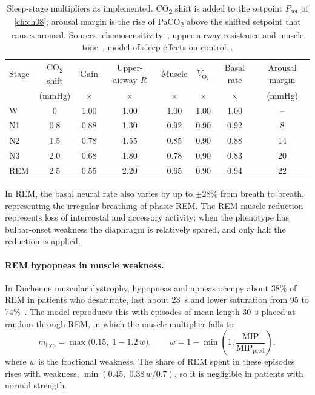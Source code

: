 \begin{table}[ht]
\centering
\caption{Sleep-stage multipliers as implemented. CO\textsubscript{2} shift is added to the setpoint $P_{\mathrm{set}}$ of \cref{ch:ch08}; arousal margin is the rise of PaCO\textsubscript{2} above the shifted setpoint that causes arousal. Sources: chemosensitivity~\citep{douglas1982,berthonjones1984}, upper-airway resistance and muscle tone~\citep{horner1996,white2005}, model of sleep effects on control~\citep{khoo1982}.}
\label{tab:sl-phys}
\small
\begin{tabular}{@{}lccccccc@{}}
\toprule
Stage & CO\textsubscript{2} shift & Gain & Upper-airway $R$ & Muscle & $\dot V_{\mathrm{O_2}}$ & Basal rate & Arousal margin \\
 & (mmHg) & $\times$ & $\times$ & $\times$ & $\times$ & $\times$ & (mmHg) \\
\midrule
W   & 0   & 1.00 & 1.00 & 1.00 & 1.00 & 1.00 & -- \\
N1  & 0.8 & 0.88 & 1.30 & 0.92 & 0.90 & 0.92 & 8 \\
N2  & 1.5 & 0.78 & 1.55 & 0.85 & 0.90 & 0.88 & 14 \\
N3  & 2.0 & 0.68 & 1.80 & 0.78 & 0.90 & 0.83 & 20 \\
REM & 2.5 & 0.55 & 2.20 & 0.65 & 0.90 & 0.94 & 22 \\
\bottomrule
\end{tabular}
\end{table}

In REM, the basal neural rate also varies by up to $\pm 28\%$ from breath to breath, representing the irregular breathing of phasic REM. The REM muscle reduction represents loss of intercostal and accessory activity; when the phenotype has bulbar-onset weakness the diaphragm is relatively spared, and only half the reduction is applied.

\paragraph{REM hypopneas in muscle weakness.} In Duchenne muscular dystrophy, hypopneas and apneas occupy about 38\% of REM in patients who desaturate, last about \SI{23}{\second} and lower saturation from 95 to 74\%~\citep{smith1988}. The model reproduces this with episodes of mean length \SI{30}{\second} placed at random through REM, in which the muscle multiplier falls to
\begin{equation}
m_{\mathrm{hyp}} = \max\bigl(0.15,\;1 - 1.2\,w\bigr),\qquad
w = 1 - \min\!\left(1,\frac{\mathrm{MIP}}{\mathrm{MIP_{pred}}}\right),
\label{eq:sl-remhyp}
\end{equation}
where $w$ is the fractional weakness. The share of REM spent in these episodes rises with weakness, $\min(0.45,\;0.38\,w/0.7)$, so it is negligible in patients with normal strength.

